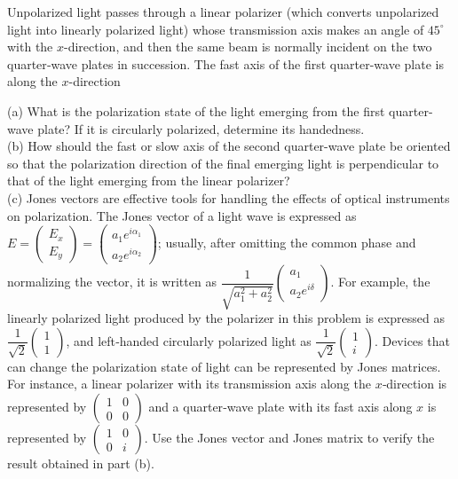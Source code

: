 \begin{example}
    Unpolarized light passes through a linear polarizer (which converts unpolarized light into linearly polarized light) whose transmission axis makes an angle of $45^\circ$ with the $x$-direction, and then the same beam is normally incident on the two quarter‑wave plates in succession. The fast axis of the first quarter-wave plate is along the $x$-direction

    (a) What is the polarization state of the light emerging from the first quarter-wave plate? If it is circularly polarized, determine its handedness.\\
    (b) How should the fast or slow axis of the second quarter-wave plate be oriented so that the polarization direction of the final emerging light is perpendicular to that of the light emerging from the linear polarizer? \\
    (c) Jones vectors are effective tools for handling the effects of optical instruments on polarization. The Jones vector of a light wave is expressed as $E = \left(\begin{matrix} E_x\\ E_y \end{matrix}\right) = \left(\begin{matrix}a_1 e^{i\alpha_1}\\ a_2 e^{i\alpha_2} \end{matrix}\right)$; usually, after omitting the common phase and normalizing the vector, it is written as $\dfrac{1}{\sqrt{a_1^2 + a_2^2}}\left(\begin{matrix}a_1\\ a_2 e^{i\delta}\end{matrix}\right)$. For example, the linearly polarized light produced by the polarizer in this problem is expressed as $\dfrac{1}{\sqrt{2}}\left(\begin{matrix}1\\ 1\end{matrix}\right)$, and left‑handed circularly polarized light as $\dfrac{1}{\sqrt{2}}\left(\begin{matrix}1\\ i\end{matrix}\right)$. Devices that can change the polarization state of light can be represented by Jones matrices. For instance, a linear polarizer with its transmission axis along the $x$‑direction is represented by $\left(\begin{matrix}1 & 0\\ 0 & 0\end{matrix}\right)$ and a quarter‑wave plate with its fast axis along $x$ is represented by $\left(\begin{matrix}1 & 0\\ 0 & i\end{matrix}\right)$. Use the Jones vector and Jones matrix to verify the result obtained in part (b).
\end{example}